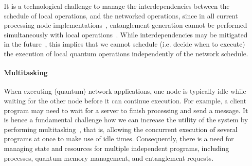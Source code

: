 It is a technological challenge to manage the interdependencies between the schedule of local operations, and the networked operations, since in all current processing node implementations~\cite{pompili_2021_multinode,drmota_robust_2023}, entanglement generation cannot be performed simultaneously with local operations~\cite{pompili_2021_multinode,krutyanskiy_light-matter_2019}.
While interdependencies may be mitigated in the future~\cite{vardoyan_2022_netarch}, this implies that we cannot schedule (i.e. decide when to execute) the execution of local quantum operations independently of the network schedule.

\paragraph{Multitasking}
When executing (quantum) network applications, one node is typically idle while waiting for the other node before it can continue execution.
For example, a client program may need to wait for a server to finish processing and send a message.
It is hence a fundamental challenge how we can increase the utility of the system by performing multitasking~\cite{mccullough_design_1965-1,dennis_segmentation_1965}, that is, allowing the concurrent execution of several programs at once to make use of idle times.
Consequently, there is a need for managing state and resources for multiple independent programs, including processes, quantum memory management, and entanglement requests. 

